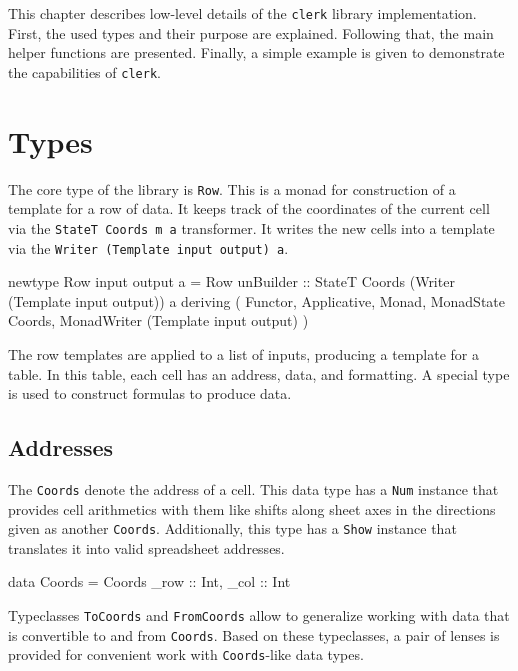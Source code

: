 This chapter describes low-level details of the \texttt{clerk} library implementation. First, the used types and their purpose are explained. Following that, the main helper functions are presented. Finally, a simple example is given to demonstrate the capabilities of \texttt{clerk}.

\section{Types}
\label{sec:types}

The core type of the library is \texttt{Row}. This is a monad for construction of a template for a row of data. It keeps track of the coordinates of the current cell via the \texttt{StateT Coords m a} transformer. It writes the new cells into a template via the \texttt{Writer (Template input output) a}.

\begin {mycode}
newtype Row input output a = Row
  { unBuilder :: StateT Coords (Writer (Template input output)) a
  }
  deriving (
    Functor,  Applicative,  Monad,  MonadState Coords,
    MonadWriter (Template input output)
  )
\end{mycode}

The row templates are applied to a list of inputs, producing a template for a table.
In this table, each cell has an address, data, and formatting. A special type is used to construct formulas to produce data.

\subsection{Addresses}
\label{sec:addresses}

The \texttt{Coords} denote the address of a cell. This data type has a \texttt{Num} instance that provides cell arithmetics with them like shifts along sheet axes in the directions given as another \texttt{Coords}. Additionally, this type has a \texttt{Show} instance that translates it into valid spreadsheet addresses.

\begin{mycode}
data Coords = Coords {_row :: Int, _col :: Int}
\end{mycode}

Typeclasses \texttt{ToCoords} and \texttt{FromCoords} allow to generalize working with data that is convertible to and from \texttt{Coords}. Based on these typeclasses, a pair of lenses is provided for convenient work with \texttt{Coords}-like data types.

